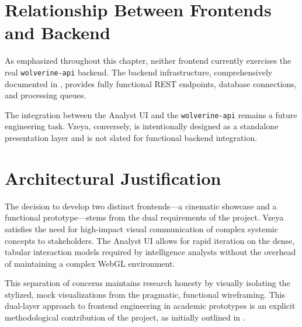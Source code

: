 \section{Relationship Between Frontends and Backend}
\label{sec:fe-backend-relationship}

As emphasized throughout this chapter, neither frontend currently exercises the real \texttt{wolverine-api} backend. The backend infrastructure, comprehensively documented in , provides fully functional REST endpoints, database connections, and processing queues.

The integration between the Analyst UI and the \texttt{wolverine-api} remains a future engineering task. Vzeya, conversely, is intentionally designed as a standalone presentation layer and is not slated for functional backend integration.

\section{Architectural Justification}
\label{sec:fe-justification}

The decision to develop two distinct frontends—a cinematic showcase and a functional prototype—stems from the dual requirements of the project. Vzeya satisfies the need for high-impact visual communication of complex systemic concepts to stakeholders. The Analyst UI allows for rapid iteration on the dense, tabular interaction models required by intelligence analysts without the overhead of maintaining a complex WebGL environment.

This separation of concerns maintains research honesty by visually isolating the stylized, mock visualizations from the pragmatic, functional wireframing. This dual-layer approach to frontend engineering in academic prototypes is an explicit methodological contribution of the project, as initially outlined in .
